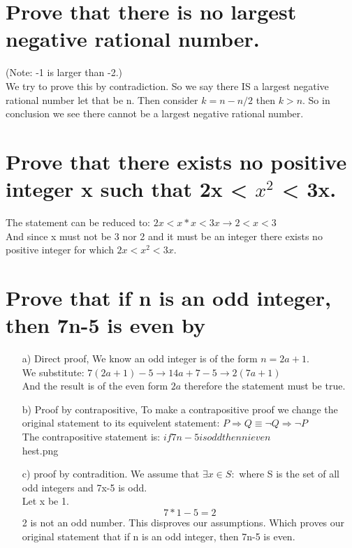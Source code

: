 \section{Prove that there is no largest negative rational number.}
(Note: -1 is larger than -2.)\\
We try to prove this by contradiction. So we say there IS a largest negative rational number let that be n.
Then consider $k=n-n/2$ then $k>n$. So in conclusion we see there cannot be a largest negative rational number.

\section{Prove that there exists no positive integer x such that 2x < $x^2$ < 3x.}
The statement can be reduced to: $2x<x*x<3x\rightarrow2<x<3$\\
And since x must not be 3 nor 2 and it must be an integer there exists no positive integer for which $2x<x^2<3x$.

\section{Prove that if n is an odd integer, then 7n-5 is even by}
\begin{itemize}
\item[a)] Direct proof,
We know an odd integer is of the form $n=2a+1$.\\
We substitute: $7(2a+1)-5\rightarrow14a+7-5\rightarrow2(7a+1)$\\
And the result is of the even form $2a$ therefore the statement must be true.
\item[b)] Proof by contrapositive,
To make a contrapositive proof we change the original statement to its equivelent statement: $P \Rightarrow Q \equiv \neg Q \Rightarrow \neg P$\\
The contrapositive statement is: $if 7n-5 is odd then n i even$\\
hest.png
\item[c)] proof by contradition.
We assume that $\exists x \in S:$ where S is the set of all odd integers and 7x-5 is odd.\\
Let x be 1.
\begin{equation}
7*1-5 = 2
\end{equation}
2 is not an odd number.
This disproves our assumptions.
Which proves our original statement that if n is an odd integer, then 7n-5 is even.
\end{itemize}


